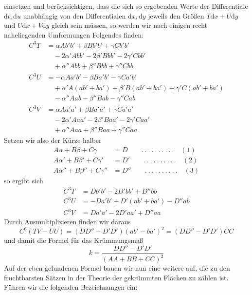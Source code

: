 %
einsetzen und berücksichtigen, dass die sich so ergebenden Werte der Differentiale \(\mathrm{d}t,\mathrm{d}u\) unabhängig von den Differentialen \(\mathrm{d}x,\mathrm{d}y\) jeweils den Größen \(T\mathrm{d}x+U\mathrm{d}y\) und \(U\mathrm{d}x+V\mathrm{d}y\) gleich sein müssen, so werden wir nach einigen recht naheliegenden Umformungen Folgendes finden:
\[
\begin{aligned}
C^3T&=\alpha Ab'b'+\beta Bb'b'+\gamma Cb'b'\\
&\quad-2\alpha'Abb'-2\beta'Bbb'-2\gamma'Cbb'\\
&\quad+\alpha''Abb+\beta''Bbb+\gamma''Cbb\\
C^3U&=-\alpha Aa'b'-\beta Ba'b'-\gamma Ca'b'\\
&\quad+\alpha'A(ab'+ba')+\beta'B(ab'+ba')+\gamma'C(ab'+ba')\\
&\quad-\alpha''Aab-\beta''Bab-\gamma''Cab\\
C^3V&=\alpha Aa'a'+\beta Ba'a'+\gamma Ca'a'\\
&\quad-2\alpha'Aaa'-2\beta'Baa'-2\gamma'Caa'\\
&\quad+\alpha''Aaa+\beta''Baa+\gamma''Caa
\end{aligned}
\]
Setzen wir also der Kürze halber
\[
\begin{aligned}
A\alpha+B\beta+C\gamma&=D\qquad .\ .\ .\ .\ .\ .\ .\ .\ .\ .\quad(1)\\
A\alpha'+B\beta'+C\gamma'&=D'\qquad .\ .\ .\ .\ .\ .\ .\ .\ .\ .\quad(2)\\
A\alpha''+B\beta''+C\gamma''&=D''\qquad .\ .\ .\ .\ .\ .\ .\ .\ .\ .\quad(3)
\end{aligned}
\]
so ergibt sich
\[
\begin{aligned}
C^3T&=Db'b'-2D'bb'+D''bb\\
C^3U&=-Da'b'+D'(ab'+ba')-D''ab\\
C^3V&=Da'a'-2D'aa'+D''aa
\end{aligned}
\]
Durch Ausmultiplizieren finden wir daraus
\[
C^6(TV-UU)=(DD''-D'D')(ab'-ba')^2=(DD''-D'D')CC
\]
und damit die Formel für das Krümmungsmaß
\[
k=\frac{DD''-D'D'}{(AA+BB+CC)^2}
\]
Auf der eben gefundenen Formel bauen wir nun eine weitere auf, die zu den fruchtbarsten Sätzen in der Theorie der gekrümmten Flächen zu zählen ist. Führen wir die folgenden Bezeichnungen ein:

